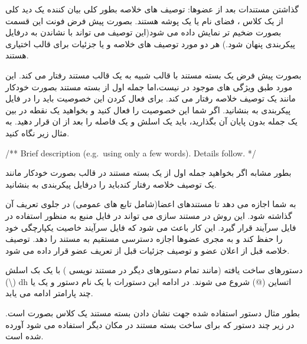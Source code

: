 گذاشتن مستندات بعد از عضوها:
توصیف های خلاصه بطور کلی بیان کننده یک دید کلی از یک کلاس ، فضای نام یا یک پوشه
هستند. بصورت پیش فرض فونت این قسمت بصورت ضخیم تر نمایش داده می شود(این توصیف می
تواند با نشاندن  به درفایل پیکربندی پنهان شود.) هر دو مورد
توصیف های خلاصه و یا جزئیات برای قالب  اختیاری هستند.

بصورت پیش فرض یک بسته مستند با قالب  شبیه به یک قالب مستند 
رفتار می کند.
این مورد طبق ویژگی های موجود در  نیست،اما جمله اول از بسته مستند
بصورت خودکار مانند یک توصیف خلاصه رفتار می کند.
برای فعال کردن این خصوصیت باید
 را در فایل پیکربندی به  بنشانید. اگر شما این
خصوصیت را فعال کنید و بخواهید یک نقطه در بین یک جمله بدون پایان آن بگذارید،
باید یک اسلش و یک فاصله را بعد از ان قرار دهید. به مثال زیر نگاه کنید.

\begin{C++}
/** Brief description (e.g.\ using only a few words). Details follow. */
\end{C++}

بطور مشابه اگر بخواهید جمله اول از یک بسته مستند در قالب  بصورت خودکار
مانند یک توصیف خلاصه رفتار کندباید  را درفایل پیکربندی
به بنشانید.

 به شما اجازه می دهد تا مستندهای اعضا(شامل تابع های عمومی) در جلوی
تعریف آن  گذاشته شود. این روش در مستند سازی می تواند در فایل منبع
به منظور استفاده در فایل سرآیند قرار گیرد. این کار باعث می شود که فایل سرآیند
خاصیت یکپارچگی خود را حفظ کند و به مجری عضوها اجازه دسترسی مستقیم به مستند را
دهد. توصیف خلاصه قبل از اعلان عضو و توصیف جزئیات قبل از تعریف عضو قرار داده می
شود.



دستورهای ساخت یافته (مانند تمام دستورهای دیگر در مستند نویسی ) با یک
بک اسلش (\textbackslash) dh اتساین (@) شروع می شوند.
در ادامه این دستورات با یک نام دستور و یک یا چند پارامتر ادامه می یابد.

بطور مثال دستور استفاده شده جهت نشان دادن بسته مستند یک کلاس بصورت
است. در زیر چند دستور که برای ساخت بسته مستند در مکان دیگر استفاده می شود آورده
شده است.


